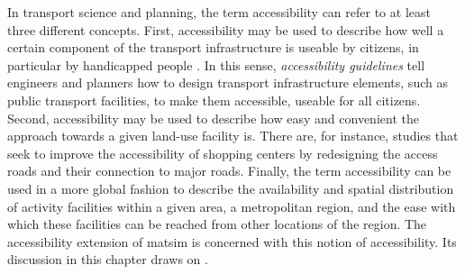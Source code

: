 In transport science and planning, the term accessibility can refer to at least three different concepts. 
First, accessibility may be used to describe how well a certain component of the transport infrastructure 
is useable by citizens, in particular by handicapped people \citep{Faura2012AccessibilityEvaluationTrafficSimulation}. 
In this sense, \textit{accessibility guidelines} tell engineers and planners how to design transport 
infrastructure elements, such as public transport facilities, to make them accessible, \ie useable 
for all citizens. Second, accessibility may be used to describe how easy and convenient the approach 
towards a given land-use facility is. There are, for instance, studies \citep{Fujiyama2004AccessibleDesignPTFacilities} 
that seek to improve the accessibility of shopping centers by redesigning the access roads and their 
connection to major roads. Finally, the term accessibility can be used in a more global fashion to 
describe the availability and spatial distribution of activity facilities within a given area, \eg a 
metropolitan region, and the ease with which these facilities can be reached from other locations of 
the region. The accessibility extension of \gls{matsim} is concerned with this notion of accessibility. 
Its discussion in this chapter draws on \citet{NicolaiNagel2012HiResAccessibilityMethodInBook}.


